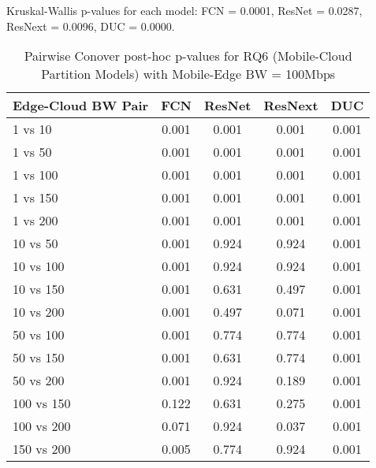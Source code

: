 \begin{table}[h]
\centering
\caption{Pairwise Conover post-hoc p-values for RQ6 (Mobile-Cloud Partition Models) with Mobile-Edge BW = 100Mbps}
\label{tab:conover_mobile_cloud_partition_me100}
\smallskip
Kruskal-Wallis p-values for each model: FCN = 0.0001, ResNet = 0.0287, ResNext = 0.0096, DUC = 0.0000.

\begin{tabular}{lcccc}
\toprule
Edge-Cloud BW Pair & FCN & ResNet & ResNext & DUC \\
\midrule
1 vs 10 & 0.001 & 0.001 & 0.001 & 0.001 \\
1 vs 50 & 0.001 & 0.001 & 0.001 & 0.001 \\
1 vs 100 & 0.001 & 0.001 & 0.001 & 0.001 \\
1 vs 150 & 0.001 & 0.001 & 0.001 & 0.001 \\
1 vs 200 & 0.001 & 0.001 & 0.001 & 0.001 \\
10 vs 50 & 0.001 & 0.924 & 0.924 & 0.001 \\
10 vs 100 & 0.001 & 0.924 & 0.924 & 0.001 \\
10 vs 150 & 0.001 & 0.631 & 0.497 & 0.001 \\
10 vs 200 & 0.001 & 0.497 & 0.071 & 0.001 \\
50 vs 100 & 0.001 & 0.774 & 0.774 & 0.001 \\
50 vs 150 & 0.001 & 0.631 & 0.774 & 0.001 \\
50 vs 200 & 0.001 & 0.924 & 0.189 & 0.001 \\
100 vs 150 & 0.122 & 0.631 & 0.275 & 0.001 \\
100 vs 200 & 0.071 & 0.924 & 0.037 & 0.001 \\
150 vs 200 & 0.005 & 0.774 & 0.924 & 0.001 \\
\bottomrule
\end{tabular}
\end{table}

